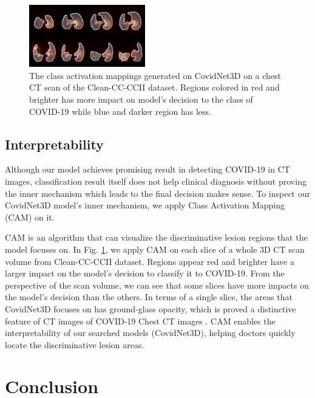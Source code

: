 \documentclass[letterpaper]{article}
\begin{document}
\begin{figure}[!ht]
    \centering
    \includegraphics[width=0.45\textwidth]{images/heatmap.png}
    \caption{The class activation mappings generated on CovidNet3D on a chest CT scan of the Clean-CC-CCII dataset. Regions colored in red and brighter has more impact on model's decision to the class of COVID-19 while blue and darker region has less.}
    \label{fig:cam}
\end{figure}


\subsection{Interpretability}
Although our model achieves promising result in detecting COVID-19 in CT images, classification result itself does not help clinical diagnosis without proving the inner mechanism which leads to the final decision makes sense. To inspect our CovidNet3D model's inner mechanism, we apply Class Activation Mapping (CAM) \cite{cam} on it.

CAM is an algorithm that can visualize the discriminative lesion regions that the model focuses on. In Fig. \ref{fig:cam}, we apply CAM on each slice of a whole 3D CT scan volume from Clean-CC-CCII dataset. Regions appear red and brighter have a larger impact on the model's decision to classify it to COVID-19. From the perspective of the scan volume, we can see that some slices have more impacts on the model's decision than the others. In terms of a single slice, the areas that CovidNet3D focuses on has ground-glass opacity, which is proved a distinctive feature of CT images of COVID-19 Chest CT images \cite{radio-chestCT}. CAM enables the interpretability of our searched models (CovidNet3D), helping doctors quickly locate the discriminative lesion areas.














\section{Conclusion}
\end{document}
